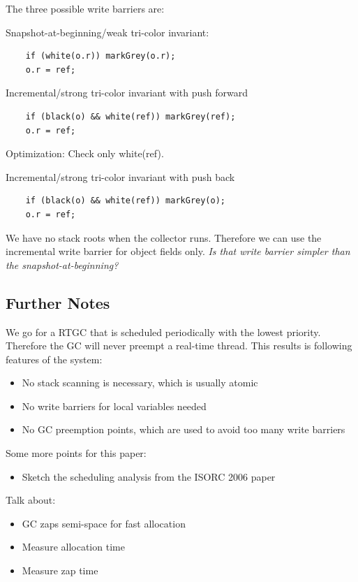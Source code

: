 The three possible write barriers are:

Snapshot-at-beginning/weak tri-color invariant:
\begin{verbatim}
    if (white(o.r)) markGrey(o.r);
    o.r = ref;
\end{verbatim}

Incremental/strong tri-color invariant with push forward
\begin{verbatim}
    if (black(o) && white(ref)) markGrey(ref);
    o.r = ref;
\end{verbatim}
Optimization: Check only white(ref).

Incremental/strong tri-color invariant with push back
\begin{verbatim}
    if (black(o) && white(ref)) markGrey(o);
    o.r = ref;
\end{verbatim}

We have no stack roots when the collector runs. Therefore we can use
the incremental write barrier for object fields only. \emph{Is that
write barrier simpler than the snapshot-at-beginning?}



\subsection{Further Notes}

We go for a RTGC that is scheduled periodically with the lowest
priority. Therefore the GC will never preempt a real-time thread.
This results is following features of the system:

\begin{itemize}
    \item No stack scanning is necessary, which is usually atomic
    \item No write barriers for local variables needed
    \item No GC preemption points, which are used to avoid too many
    write barriers
\end{itemize}

Some more points for this paper:

\begin{itemize}
    \item Sketch the scheduling analysis from the ISORC 2006 paper
    \cite{jop:rtgc_sched}
\end{itemize}

Talk about:\begin{itemize}
    \item GC zaps semi-space for fast allocation
    \item Measure allocation time
    \item Measure zap time
\end{itemize}

